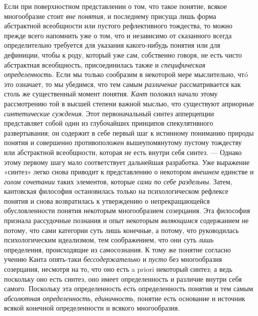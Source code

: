 \documentclass[twoside]{article}
\begin{document}
{{Если при поверхностном представлении о том, что такое понятие,
всякое многообразие стоит {\em вне
понятия}, и последнему присуща лишь форма абстрактной
всеобщности или пустого рефлективного тождества, то можно прежде всего
напомнить уже о том, что и независимо от сказанного всегда определительно
требуется для указания какого-нибудь понятия или для
дефиниции, чтобы к роду, который уже сам, собственно говоря, не есть чисто
абстрактная всеобщность, присоединилась также и
{\em специфическая определенность}.
Если мы только сообразим в некоторой мере мыслительно, чтó
это означает, то мы убедимся, что тем самым
{\em различение}
рассматривается как столь же существенный момент понятия.
{\em Кант} положил начало
этому рассмотрению той в высшей степени важной мыслью, что существуют
априорные {\em синтетические суждения}.
Этот первоначальный синтез апперцепции представляет собой
один из глубочайших принципов спекулятивного развертывания; он содержит в
себе первый шаг к истинному пониманию природы понятия и совершенно
противоположен вышеупомянутому пустому тождеству или абстрактной
всеобщности, которая не есть внутри себя синтез. — Однако
этому первому шагу мало соответствует дальнейшая разработка. Уже выражение
«синтез» легко снова приводит к представлению о некотором
{\em внешнем} единстве и
{\em голом сочетании}
таких элементов, которые
{\em сами по себе раздельны}.
Затем, кантовская философия остановилась только на
психологическом рефлексе понятия и снова возвратилась к утверждению о
непрекращающейся обусловленности понятия некоторым многообразием
созерцания. Эта философия признала рассудочные познания и опыт некоторым
{\em являющимся}
содержанием не потому, что сами категории суть лишь конечные,
а потому, что руководилась психологическим идеализмом, тем соображением,
что они суть {\em лишь}
определения, происходящие из самосознания. К тому же понятие
согласно учению Канта опять-таки
{\em бессодержательно} и
{\em пусто} без
многообразия созерцания, несмотря на то, что оно есть a priori
некоторый синтез; а ведь поскольку оно есть синтез, оно имеет
определенность и различие внутри себя самого. Поскольку эта определенность
есть определенность понятия и тем самым
{\em абсолютная определенность},
{\em единичность}, понятие
есть основание и источник всякой конечной определенности и всякого
многообразия.

}}
\end{document}
